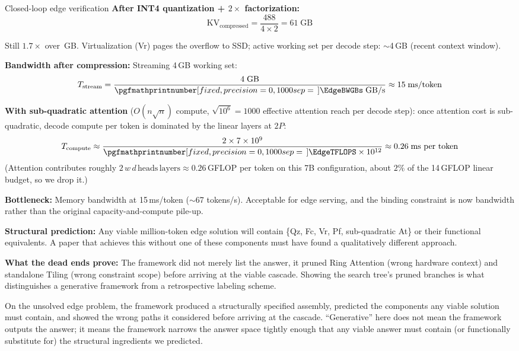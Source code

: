 \documentclass[10pt,twocolumn]{article}
\newcommand{\cvalint}[1]{\pgfmathprintnumber[fixed, precision=0, 1000 sep={\,}]{#1}}
\newcommand{\EdgeKVTotalGB}{488}  %
\begin{document}
\begin{napkinmath}{Closed-loop edge verification}
\textbf{After INT4 quantization + $2\times$ factorization:}
\[
\text{KV}_{\text{compressed}} = \frac{\EdgeKVTotalGB{}}{4 \times 2} = 61\;\text{GB}
\]

Still $1.7\times$ over \cvalint{\EdgeRAMGB}\,GB. Virtualization (Vr) pages the overflow to SSD; active working set per decode step: ${\sim}$4\,GB (recent context window).

\textbf{Bandwidth after compression:} Streaming 4\,GB working set:
\[
T_{\text{stream}} = \frac{4\;\text{GB}}{\cvalint{\EdgeBWGBs}\;\text{GB/s}} \approx 15\;\text{ms/token}
\]

\textbf{With sub-quadratic attention} ($O(n\sqrt{n})$ compute, $\sqrt{10^6} = 1000$ effective attention reach per decode step): once attention cost is sub-quadratic, decode compute per token is dominated by the linear layers at $2P$:
\[
T_{\text{compute}} \approx \frac{2 \times 7 \times 10^9}{\cvalint{\EdgeTFLOPS} \times 10^{12}} \approx 0.26\;\text{ms per token}
\]
(Attention contributes roughly $2\, w\, d\, \text{heads}\, \text{layers} \approx 0.26$\,GFLOP per token on this 7B configuration, about $2\%$ of the 14\,GFLOP linear budget, so we drop it.)

\textbf{Bottleneck:} Memory bandwidth at 15\,ms/token ($\sim$67 tokens/s). Acceptable for edge serving, and the binding constraint is now bandwidth rather than the original capacity-and-compute pile-up.

\textbf{Structural prediction:} Any viable million-token edge solution will contain \{Qz, Fc, Vr, Pf, sub-quadratic At\} or their functional equivalents. A paper that achieves this without one of these components must have found a qualitatively different approach.

\textbf{What the dead ends prove:} The framework did not merely list the answer, it pruned Ring Attention (wrong hardware context) and standalone Tiling (wrong constraint scope) before arriving at the viable cascade. Showing the search tree's pruned branches is what distinguishes a generative framework from a retrospective labeling scheme.
\end{napkinmath}

On the unsolved edge problem, the framework produced a structurally specified assembly, predicted the components any viable solution must contain, and showed the wrong paths it considered before arriving at the cascade. ``Generative'' here does not mean the framework outputs the answer; it means the framework narrows the answer space tightly enough that any viable answer must contain (or functionally substitute for) the structural ingredients we predicted.
\end{document}
